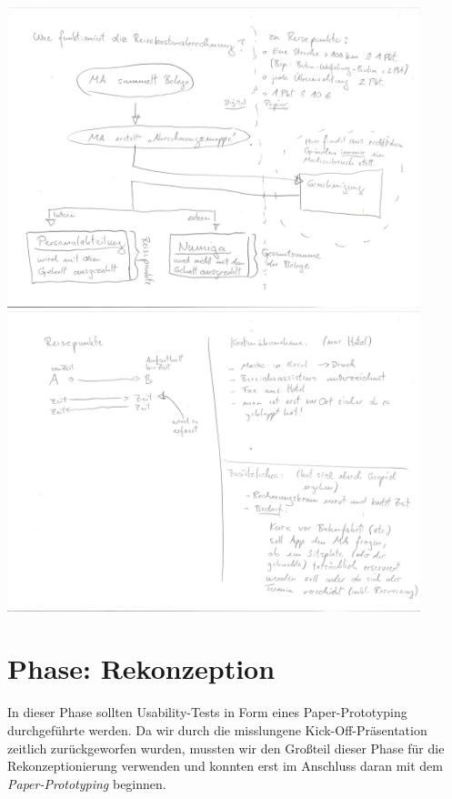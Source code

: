 \documentclass{article}
\begin{document}
\begin{center}
\includegraphics[width=12cm]{04_softwareloesung02_002.jpg}\\
\includegraphics[width=12cm]{04_softwareloesung02_003.jpg}\\
\end{center}


\section{Phase: Rekonzeption}

In dieser Phase sollten Usability-Tests in Form eines Paper-Prototyping durchgef\"uhrte werden. Da wir durch die misslungene Kick-Off-Pr\"asentation zeitlich zur\"uckgeworfen wurden, mussten wir den Gro\ss teil dieser Phase f\"ur die Rekonzeptionierung verwenden und konnten erst im Anschluss daran mit dem \textit{Paper-Prototyping} beginnen.
\end{document}
